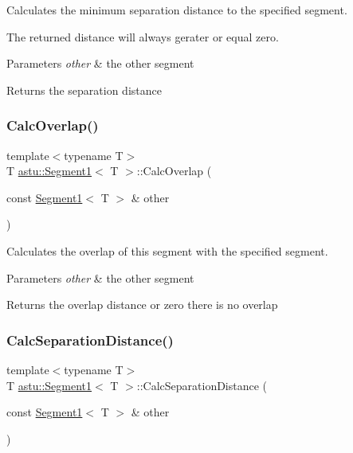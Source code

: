 Calculates the minimum separation distance to the specified segment.

The returned distance will always gerater or equal zero.


\begin{DoxyParams}{Parameters}
{\em other} & the other segment \\
\hline
\end{DoxyParams}
\begin{DoxyReturn}{Returns}
the separation distance 
\end{DoxyReturn}
\mbox{\label{classastu_1_1Segment1_a329ce84a2bc6a9cfeea1d44495e14d8f}} 
\subsubsection{\texorpdfstring{Calc\+Overlap()}{CalcOverlap()}}
{\footnotesize\ttfamily template$<$typename T$>$ \\
T \hyperlink{classastu_1_1Segment1}{astu\+::\+Segment1}$<$ T $>$\+::Calc\+Overlap (\begin{DoxyParamCaption}\item[{const \hyperlink{classastu_1_1Segment1}{Segment1}$<$ T $>$ \&}]{other }\end{DoxyParamCaption})\hspace{0.3cm}{\ttfamily [inline]}}

Calculates the overlap of this segment with the specified segment.


\begin{DoxyParams}{Parameters}
{\em other} & the other segment \\
\hline
\end{DoxyParams}
\begin{DoxyReturn}{Returns}
the overlap distance or zero there is no overlap 
\end{DoxyReturn}
\mbox{\label{classastu_1_1Segment1_a414a486080dc65ffce284aea931ddea3}} 
\subsubsection{\texorpdfstring{Calc\+Separation\+Distance()}{CalcSeparationDistance()}}
{\footnotesize\ttfamily template$<$typename T$>$ \\
T \hyperlink{classastu_1_1Segment1}{astu\+::\+Segment1}$<$ T $>$\+::Calc\+Separation\+Distance (\begin{DoxyParamCaption}\item[{const \hyperlink{classastu_1_1Segment1}{Segment1}$<$ T $>$ \&}]{other }\end{DoxyParamCaption})\hspace{0.3cm}{\ttfamily [inline]}}

